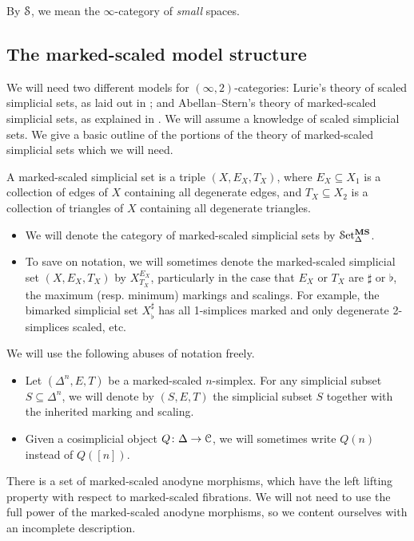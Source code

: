 \documentclass[main.tex]{subfiles}
\begin{document}
By $\S$, we mean the $\infty$-category of \emph{small} spaces.

\subsection{The marked-scaled model structure}
\label{ssc:marked-scaled_model_structure}

We will need two different models for $(\infty,2)$-categories: Lurie's theory of scaled simplicial sets, as laid out in \cite{lurie2009infinity}; and Abellan--Stern's theory of marked-scaled simplicial sets, as explained in \cite{garcia2cartesianfibrationsii}. We will assume a knowledge of scaled simplicial sets. We give a basic outline of the portions of the theory of marked-scaled simplicial sets which we will need.

A marked-scaled simplicial set is a triple $(X, E_{X}, T_{X})$, where $E_{X} \subseteq X_{1}$ is a collection of edges of $X$ containing all degenerate edges, and $T_{X} \subseteq X_{2}$ is a collection of triangles of $X$ containing all degenerate triangles.
\begin{itemize}
  \item We will denote the category of marked-scaled simplicial sets by $\SSetms$.

  \item To save on notation, we will sometimes denote the marked-scaled simplicial set $(X, E_{X}, T_{X})$ by $X^{E_{X}}_{T_{X}}$, particularly in the case that $E_{X}$ or $T_{X}$ are $\sharp$ or $\flat$, the maximum (resp. minimum) markings and scalings. For example, the bimarked simplicial set $X^{\sharp}_{\flat}$ has all 1-simplices marked and only degenerate 2-simplices scaled, etc.
\end{itemize}

We will use the following abuses of notation freely.

\begin{itemize}
  \item Let $(\Delta^{n}, E, T)$ be a marked-scaled $n$-simplex. For any simplicial subset $S \subseteq \Delta^{n}$, we will denote by $(S, E, T)$ the simplicial subset $S$ together with the inherited marking and scaling.
        
  \item Given a cosimplicial object $Q\colon \Delta \to \category{C}$, we will sometimes write $Q(n)$ instead of $Q([n])$.
\end{itemize}

There is a set of marked-scaled anodyne morphisms, which have the left lifting property with respect to marked-scaled fibrations. We will not need to use the full power of the marked-scaled anodyne morphisms, so we content ourselves with an incomplete description.
\end{document}
